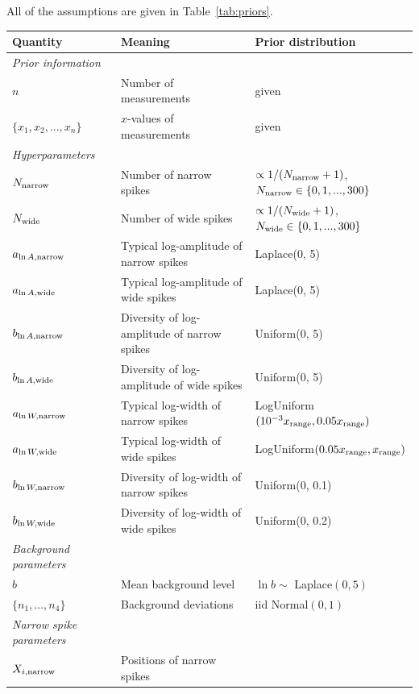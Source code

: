 \documentclass[a4paper, 12pt]{article}
\newcommand{\x}{x}
\begin{document}
All of the assumptions are given in Table~\ref{tab:priors}.

\begin{landscape}

\begin{table}
\footnotesize
\centering
\begin{tabular}{|lll|}
\hline
{\bf Quantity}      &   {\bf Meaning}   &  {\bf Prior distribution}\\
\hline
{\em Prior information}&&\\
\hline
$n$ & Number of measurements & given\\
$\{\x_1, \x_2, ..., \x_n\}$  & $\x$-values of measurements & given \\
\hline
{\em Hyperparameters} & &\\
$N_{\rm narrow}$   &   Number of narrow spikes    &  $\propto 1/(N_{\rm narrow}+1)$, $N_{\rm narrow} \in \{0, 1, ..., 300\}$ \\
$N_{\rm wide}$   &   Number of wide spikes    &  $\propto 1/(N_{\rm wide}+1)$,
$N_{\rm wide} \in \{0, 1, ..., 300\}$ \\
$a_{\ln A, \rm narrow}$ & Typical log-amplitude of narrow spikes & Laplace(0, 5)\\
$a_{\ln A, \rm wide}$ & Typical log-amplitude of wide spikes & Laplace(0, 5)\\
$b_{\ln A, \rm narrow}$ & Diversity of log-amplitude of narrow spikes & Uniform(0, 5)\\
$b_{\ln A, \rm wide}$ & Diversity of log-amplitude of wide spikes & Uniform(0, 5)\\
$a_{\ln W, \rm narrow}$ & Typical log-width of narrow spikes & LogUniform$(10^{-3}x_{\rm range}, 0.05x_{\rm range})$\\
$a_{\ln W, \rm wide}$ & Typical log-width of wide spikes & LogUniform$(0.05x_{\rm range}, x_{\rm range})$\\
$b_{\ln W, \rm narrow}$ & Diversity of log-width of narrow spikes & Uniform(0, 0.1)\\
$b_{\ln W, \rm wide}$ & Diversity of log-width of wide spikes & Uniform(0, 0.2)\\
\hline
{\em Background parameters}&&\\
$b$       & Mean background level       & $\ln b \sim $ Laplace$(0, 5)$\\
$\{n_1, ..., n_4\}$  & Background deviations & iid Normal$(0,1)$\\
\hline
{\em Narrow spike parameters}&&\\
$X_{i, \rm narrow}$ & Positions of narrow spikes &

\end{tabular}
\end{table}
\end{landscape}
\end{document}

